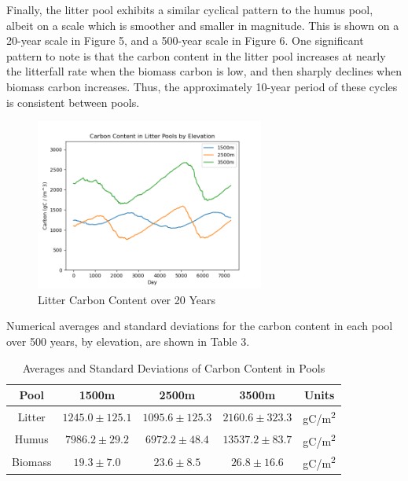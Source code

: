 \documentclass[12pt, letterpaper]{article}
\begin{document}
Finally, the litter pool exhibits a similar cyclical pattern to the humus pool, albeit on a scale which is smoother and smaller in magnitude. This is shown on a 20-year scale in Figure 5, and a 500-year scale in Figure 6. One significant pattern to note is that the carbon content in the litter pool increases at nearly the litterfall rate when the biomass carbon is low, and then sharply declines when biomass carbon increases. Thus, the approximately 10-year period of these cycles is consistent between pools. 

\begin{figure}[hp]
    \centering
    \includegraphics[width=0.67\textwidth]{litter20years.png}
    \caption{Litter Carbon Content over 20 Years}
    \label{fig:my_label}
\end{figure}

Numerical averages and standard deviations for the carbon content in each pool over 500 years, by elevation, are shown in Table 3.

\begin{table}[hp]
\begin{center}
\begin{tabular}{ c c c c c }
Pool & 1500m & 2500m & 3500m & Units \\
\hline 
Litter & $1245.0 \pm 125.1$ & $1095.6 \pm 125.3$ & $2160.6 \pm 323.3$ & gC/m\textsuperscript{2} \\
Humus & $7986.2 \pm 29.2$ & $6972.2 \pm 48.4$ & $13537.2 \pm 83.7$ & gC/m\textsuperscript{2} \\
Biomass & $19.3 \pm 7.0$ & $23.6 \pm 8.5$ & $26.8 \pm 16.6$ & gC/m\textsuperscript{2}

\end{tabular}
\end{center}
\caption{\label{tab:table-name}Averages and Standard Deviations of Carbon Content in Pools}
\end{table}
\end{document}
